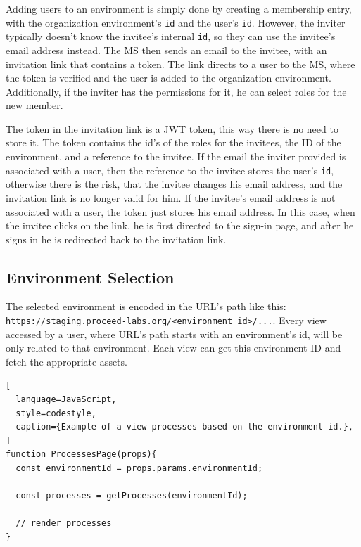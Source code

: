 Adding users to an environment is simply done by creating a membership entry, with the
organization environment's \lstinline{id} and the user's \lstinline{id}.
However, the inviter typically doesn't know the invitee's internal \lstinline{id},
so they can use the invitee's email address instead.
The MS then sends an email to the invitee, with an invitation link that contains a token.
The link directs to a user to the MS, where the token is verified and the user is added to
the organization environment.
Additionally, if the inviter has the permissions for it, he can select roles for the new member.

The token in the invitation link is a JWT token, this way there is no need to store it.
The token contains the id's of the roles for
the invitees, the ID of the environment, and a reference to the invitee.
If the email the inviter provided is associated with a user, then the reference to the
invitee stores the user's \lstinline{id}, otherwise there is the risk, that the invitee
changes his email address, and the invitation link is no longer valid for him.
If the invitee's email address is not associated with a user, the token just stores his
email address.
In this case, when the invitee clicks on the link, he is first directed to the sign-in
page, and after he signs in he is redirected back to the invitation link.


\subsection{Environment Selection}


The selected environment is encoded in the URL's path like this:
\lstinline{https://staging.proceed-labs.org/<environment id>/...}.
Every view accessed by a user, where URL's path starts with an environment's id, will be
only related to that environment.
Each view can get this environment ID and fetch the appropriate assets.

\begin{lstlisting}[
  language=JavaScript,
  style=codestyle,
  caption={Example of a view processes based on the environment id.},
]
function ProcessesPage(props){
  const environmentId = props.params.environmentId; 

  const processes = getProcesses(environmentId);

  // render processes
}
\end{lstlisting}

